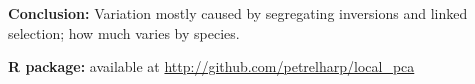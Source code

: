 \documentclass[fontscale=0.38,a0paper]{baposter}
\begin{document}
\begin{poster}
{    \textbf{Conclusion:}
    Variation mostly caused by segregating inversions
    and linked selection;
    how much varies by species.
    \vspace{1em}

    \textbf{R package:} available at \url{http://github.com/petrelharp/local_pca}\\
  \scriptsize
  \renewcommand{\section}[2]{\vskip 0.0em}
  
  \setlength{\bibsep}{0.0pt}
  
  }

\end{poster}%
\end{document}
